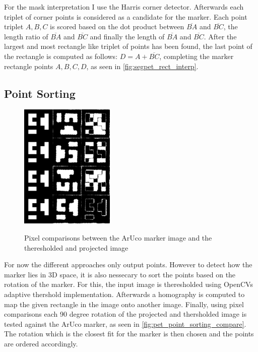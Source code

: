 \documentclass[10pt]{book}
\begin{document}
For the mask interpretation I use the Harris corner detector. Afterwards each triplet of corner points is considered as a candidate for the marker. Each point triplet $A,B,C$ is scored based on the dot product between $\overline{BA}$ and $\overline{BC}$, the length ratio of $\overline{BA}$ and $\overline{BC}$ and finally the length of $\overline{BA}$ and $\overline{BC}$. After the largest and most rectangle like triplet of points has been found, the last point of the rectangle is computed as follows: $D = A + \overline{BC}$, completing the marker rectangle points $A,B,C,D$, as seen in \autoref{fig:segpet_rect_interp}.


\subsection{Point Sorting}

\begin{figure}
  \caption{Pixel comparisons between the \ac{ArUco} marker image and the theresholded and projected image}
  \includegraphics[width=0.4\textwidth]{image/pet_point_sorting_compare}
  \label{fig:pet_point_sorting_compare}
\end{figure}

For now the different approaches only output points. However to detect how the marker lies in 3D space, it is also nessecary to sort the points based on the rotation of the marker. For this, the input image is theresholded using \acp{OpenCV} adaptive thershold implementation. Afterwards a homography is computed to map the given rectangle in the image onto another image. Finally, using pixel comparisons each 90 degree rotation of the projected and thersholded image is tested against the \ac{ArUco} marker, as seen in \autoref{fig:pet_point_sorting_compare}. The rotation which is the closest fit for the marker is then chosen and the points are ordered accordingly.
\end{document}

